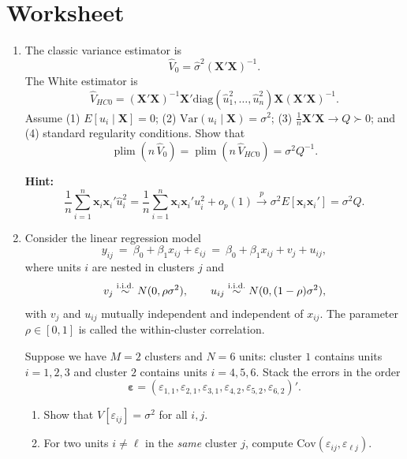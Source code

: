\documentclass[12pt]{article}
\newcommand{\bs}{\boldsymbol}
\newcommand{\mb}{\mathbf}
\newcommand{\X}{\ensuremath{\mb{X}}}
\newcommand{\x}{\ensuremath{\mb{x}}}
\renewcommand{\b}{\ensuremath{\bs{\beta}}}
\newcommand{\var}{\text{Var}}
\newcommand{\cov}{\mbox{Cov}}
\newcommand\iid{\stackrel{\rm i.i.d.}{\sim}}
\DeclareMathOperator*\plim{plim}
\begin{document}
\clearpage


\section*{Worksheet}


\begin{enumerate}\itemsep15em




\item The classic variance estimator is
\[
\widehat V_{0}
= \hat\sigma^2(\X'\X)^{-1}.
\]
The White estimator is
\[
\widehat V_{HC0}
= (\X'\X)^{-1}\X'\mathrm{diag}(\hat u_1^2,\ldots,\hat u_n^2)\X(\X'\X)^{-1}.
\]
Assume (1) $E[u_i\mid \X]=0$; (2) $\var(u_i\mid\X)=\sigma^2$; (3) $\frac{1}{n}\X'\X\to Q\succ0$; and (4) standard regularity conditions. Show that
\[
\plim (n\,\widehat V_0)=\plim (n\,\widehat V_{HC0})=\sigma^2 Q^{-1}.
\]

\noindent\textbf{Hint:}
\[
\frac{1}{n}\sum_{i=1}^n \x_i\x_i'\hat u_i^2
= \frac{1}{n}\sum_{i=1}^n \x_i\x_i' u_i^2 + o_p(1)
\xrightarrow{p}\sigma^2 E[\x_i\x_i']=\sigma^2 Q.
\]

\clearpage

\item Consider the linear regression model
\[
y_{ij} \ = \ \beta_0 + \beta_1 x_{ij} + \varepsilon_{ij} \ = \
\beta_0 + \beta_1 x_{ij} + v_j + u_{ij},
\]
where units $i$ are nested in clusters $j$ and
\[
v_j \iid N(0,\rho\sigma^2),\qquad
u_{ij} \iid N(0,(1-\rho)\sigma^2),
\]
with $v_j$ and $u_{ij}$ mutually independent and independent of $x_{ij}$. The parameter $\rho\in[0,1]$ is called the within-cluster correlation.

Suppose we have $M=2$ clusters and $N=6$ units:
cluster $1$ contains units $i=1,2,3$ and cluster $2$ contains units $i=4,5,6$.
Stack the errors in the order
\[
\bm{\varepsilon}
=
(\varepsilon_{1,1},\varepsilon_{2,1},\varepsilon_{3,1},
\varepsilon_{4,2},\varepsilon_{5,2},\varepsilon_{6,2})'.
\]

\begin{enumerate}\itemsep9em
\item Show that $V[\varepsilon_{ij}] = \sigma^2$ for all $i,j$.

\item For two units $i\neq \ell$ in the \emph{same} cluster $j$, compute $\cov(\varepsilon_{ij},\varepsilon_{\ell j}).$


\end{enumerate}
\end{enumerate}
\end{document}
